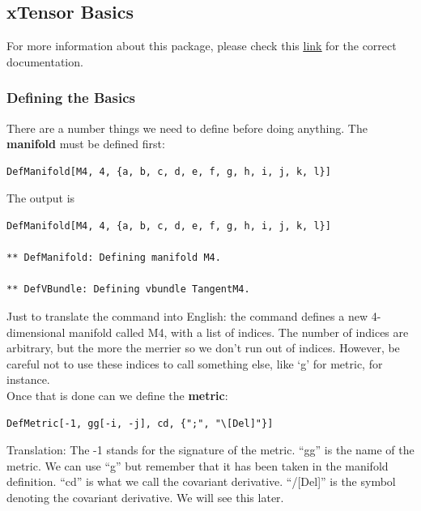 \documentclass{book}
\theoremstyle{definition}
\begin{document}
\newpage


\subsection{xTensor Basics}

For more information about this package, please check this \href{http://www.xact.es/Documentation/HTML/HTMLLinks/}{\underline{link}} for the correct documentation.


\subsubsection{Defining the Basics}

There are a number things we need to define before doing anything. The \textbf{manifold} must be defined first:
\begin{lstlisting}
DefManifold[M4, 4, {a, b, c, d, e, f, g, h, i, j, k, l}]
\end{lstlisting}
The output is
\begin{lstlisting}
DefManifold[M4, 4, {a, b, c, d, e, f, g, h, i, j, k, l}]

** DefManifold: Defining manifold M4. 

** DefVBundle: Defining vbundle TangentM4. 
\end{lstlisting}

Just to translate the command into English: the command defines a new 4-dimensional manifold called M4, with a list of indices. The number of indices are arbitrary, but the more the merrier so we don't run out of indices. However, be careful not to use these indices to call something else, like `g' for metric, for instance.\\



Once that is done can we define the \textbf{metric}:
\begin{lstlisting}
DefMetric[-1, gg[-i, -j], cd, {";", "\[Del]"}]
\end{lstlisting}
Translation: The -1 stands for the signature of the metric. ``gg'' is the name of the metric. We can use ``g'' but remember that it has been taken in the manifold definition. ``cd'' is what we call the covariant derivative. ``/[Del]'' is the symbol denoting the covariant derivative. We will see this later.\\
\end{document}
